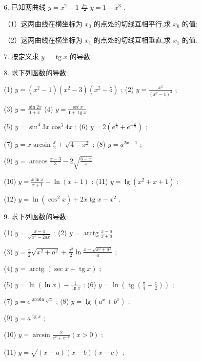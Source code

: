 \documentclass[lang=cn,newtx,10pt,scheme=chinese]{elegantbook}
\begin{document}
6. 已知两曲线 \(y = {x}^{2} - 1\) 与 \(y = 1 - {x}^{3}\) .

（1）这两曲线在横坐标为 \({x}_{0}\) 的点处的切线互相平行,求 \({x}_{0}\) 的值;

（2）这两曲线在横坐标为 \({x}_{1}\) 的点处的切线互相垂直,求 \({x}_{1}\) 的值.

7. 按定义求 \(y = \operatorname{tg}x\) 的导数.

8. 求下列函数的导数:

(1) \(y = \left( {{x}^{2} - 1}\right) \left( {{x}^{2} - 3}\right) \left( {{x}^{2} - 5}\right)\) ; (2) \(y = \frac{{x}^{2}}{{\left( {x}^{2} - 1\right) }^{3}}\) ;

(3) \(y = \frac{\sin {2x}}{1 + x}\) (4) \(y = \frac{\sec x}{1 + \operatorname{tg}x}\)

(5) \(y = {\sin }^{4}{3x}{\cos }^{3}{4x}\) ; (6) \(y = 2\left( {{e}^{\frac{x}{2}} + {e}^{-\frac{x}{2}}}\right)\) ;

(7) \(y = x\arcsin \frac{x}{2} + \sqrt{4 - {x}^{2}}\) ; (8) \(y = {a}^{{2x} + 1}\) ;

(9) \(y = \arccos \frac{x - 3}{3} - 2\sqrt{\frac{6 - x}{x}}\)

(10) \(y = \frac{x\ln x}{x + 1} - \ln \left( {x + 1}\right)\) ; (11) \(y = \lg \left( {{x}^{2} + x + 1}\right)\) ;

(12) \(y = \ln \left( {{\cos }^{2}x}\right) + {2x}\operatorname{tg}x - {x}^{2}\) .

9. 求下列函数的导数:

(1) \(y = \frac{x - a}{\sqrt{{x}^{2} - {2ax}}}\) ; (2) \(y = \operatorname{arctg}\frac{x - a}{x + a}\)

(3) \(y = \frac{x}{2}\sqrt{{x}^{2} + {a}^{2}} + \frac{{a}^{2}}{2}\ln \frac{x + \sqrt{{x}^{2} + {a}^{2}}}{a}\) ;

(4) \(y = \operatorname{arctg}\left( {\sec x + \operatorname{tg}x}\right)\) ;

(5) \(y = \ln \left( {\ln x}\right) - \frac{1}{\ln x}\) ; (6) \(y = \ln \left( {\operatorname{tg}\left( {\frac{\pi }{4} - \frac{x}{2}}\right) }\right)\) ;

(7) \(y = {e}^{\arcsin \sqrt{x}}\) ; (8) \(y = \lg \left( {{a}^{x} + {b}^{x}}\right)\) ;

(9) \(y = {a}^{\operatorname{tg}x}\) ;

(10) \(y = \arcsin \frac{2}{{e}^{x} + {e}^{-x}}\left( {x > 0}\right)\) ;

(11) \(y = \sqrt{\left( {x - a}\right) \left( {x - b}\right) \left( {x - c}\right) }\) ;
\end{document}

